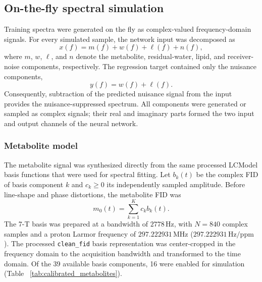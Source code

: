
\subsection{On-the-fly spectral simulation}
\label{sec:walrus_simulator}

Training spectra were generated on the fly as complex-valued frequency-domain
signals.  For every simulated sample, the network input was decomposed as
\begin{equation}
    x(f) = m(f) + w(f) + \ell(f) + n(f),
    \label{eq:simulator_input}
\end{equation}
where $m$, $w$, $\ell$, and $n$ denote the metabolite, residual-water, lipid,
and receiver-noise components, respectively.  The regression target contained
only the nuisance components,
\begin{equation}
    y(f) = w(f) + \ell(f).
    \label{eq:simulator_target}
\end{equation}
Consequently, subtraction of the predicted nuisance signal from the input
provides the nuisance-suppressed spectrum.  All components were generated or
sampled as complex signals; their real and imaginary parts formed the two input
and output channels of the neural network.

\subsubsection{Metabolite model}

The metabolite signal was synthesized directly from the same processed
LCModel basis functions that were used for spectral fitting.  Let $b_k(t)$ be
the complex FID of basis component $k$ and $c_k\geq0$ its independently sampled
amplitude.  Before line-shape and phase distortions, the metabolite FID was
\begin{equation}
    m_0(t) = \sum_{k=1}^{K} c_k b_k(t).
    \label{eq:metabolite_linear_combination}
\end{equation}
The 7-T basis was prepared at a bandwidth of $2778\,\mathrm{Hz}$, with
$N=840$ complex samples and a proton Larmor frequency of
$297.222931\,\mathrm{MHz}$ ($297.222931\,\mathrm{Hz/ppm}$).  The processed
\texttt{clean\_fid} basis representation was center-cropped in the frequency
domain to the acquisition bandwidth and transformed to the time domain.  Of
the 39 available basis components, 16 were enabled for simulation (Table~
\ref{tab:calibrated_metabolites}).

